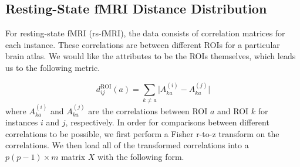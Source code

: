 \documentclass[10pt,letterpaper]{article}\usepackage[]{graphicx}\usepackage[]{color}
\begin{document}
\subsection{Resting-State fMRI Distance Distribution}

For resting-state fMRI (rs-fMRI), the data consists of correlation matrices for each instance. These correlations are between different ROIs for a particular brain atlas. We would like the attributes to be the ROIs themselves, which leads us to the following metric.

\begin{equation}\label{eq:diff_rs-fMRI}
d^\text{ROI}_{ij}(a) = \sum_{k \neq a}\bigl|A^{(i)}_{ka} - A^{(j)}_{ka}\bigr|
\end{equation}
where $A^{(i)}_{ka}$ and $A^{(j)}_{ka}$ are the correlations between ROI $a$ and ROI $k$ for instances $i$ and $j$, respectively. In order for comparisons between different correlations to be possible, we first perform a Fisher r-to-z transform on the correlations. We then load all of the transformed correlations into a $p(p-1) \times m$ matrix $X$ with the following form.
\end{document}

